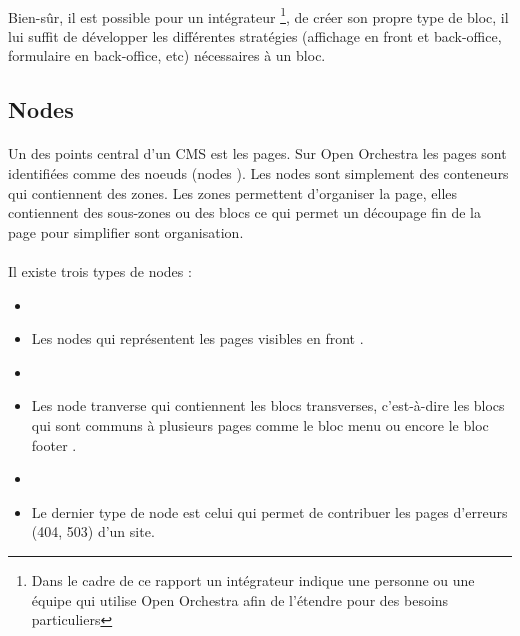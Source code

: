 	      \paragraph{}
	      	 Bien-sûr, il est possible pour un intégrateur \footnote{Dans le cadre de ce rapport un intégrateur indique une personne ou une équipe qui utilise Open Orchestra afin de  l'étendre pour des besoins particuliers}, de créer son propre type de bloc, il lui suffit de développer les différentes stratégies (affichage en front et back-office, formulaire en back-office, etc) nécessaires à un bloc.  
         \subsection{Nodes}
         \paragraph{}
         Un des points central d'un CMS est les pages. Sur Open Orchestra les pages sont identifiées comme des noeuds (\og nodes \fg{}).
          Les nodes sont simplement des conteneurs qui contiennent des zones. Les zones permettent d'organiser la page, elles contiennent des sous-zones ou des blocs ce qui permet un découpage fin de la page pour simplifier sont organisation. 
         \paragraph{}
         Il existe trois types de nodes : 
         \begin{itemize}
         \item[]
         \item  Les nodes qui représentent les pages visibles en \og front \fg{}.
          \item[]
         \item  Les \og node tranverse \fg{} qui contiennent les blocs transverses, c'est-à-dire les blocs qui sont communs à plusieurs pages comme le bloc \og menu \fg{} ou encore le bloc \og footer \fg{}.
          \item[]
         \item Le dernier type de node est celui qui permet de contribuer les pages d'erreurs (404, 503) d'un site.
         \end{itemize}
